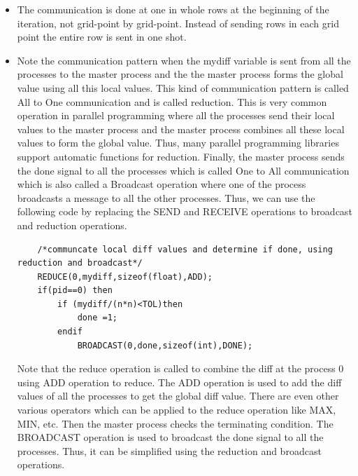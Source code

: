 \documentclass[12pt]{book}
\begin{document}
\begin{itemize}
    \item The communication is done at one in whole rows at the beginning of the iteration, not grid-point by grid-point. Instead of sending rows in each grid point the entire row is sent in one shot.
    \item Note the communication pattern when the mydiff variable is sent from all the processes to the master process and the the master process forms the global value using all this local values. This kind of communication pattern is called All to One communication and is called reduction.
    This is very common operation in parallel programming where all the processes send their local values to the master process and the master process combines all these local values to form the global value. Thus, many parallel programming libraries support automatic functions for reduction.
    Finally, the master process sends the done signal to all the processes which is called One to All communication which is also called a Broadcast operation where one of the process broadcasts a message to all the other processes.
    Thus, we can use the following code by replacing the SEND and RECEIVE operations to broadcast and reduction operations.
    \begin{lstlisting}
    /*communcate local diff values and determine if done, using reduction and broadcast*/
    REDUCE(0,mydiff,sizeof(float),ADD);
    if(pid==0) then
        if (mydiff/(n*n)<TOL)then
            done =1;
        endif
            BROADCAST(0,done,sizeof(int),DONE);
    \end{lstlisting}
    Note that the reduce operation is called to combine the diff at the process 0 using ADD operation to reduce. The ADD operation is used to add the diff values of all the processes to get the global diff value.
    There are even other various operators which can be applied to the reduce operation like MAX, MIN, etc. Then the master process checks the terminating condition. The BROADCAST operation is used to broadcast the done signal to all the processes.
    Thus, it can be simplified using the reduction and broadcast operations.
\end{itemize}
\end{document}
